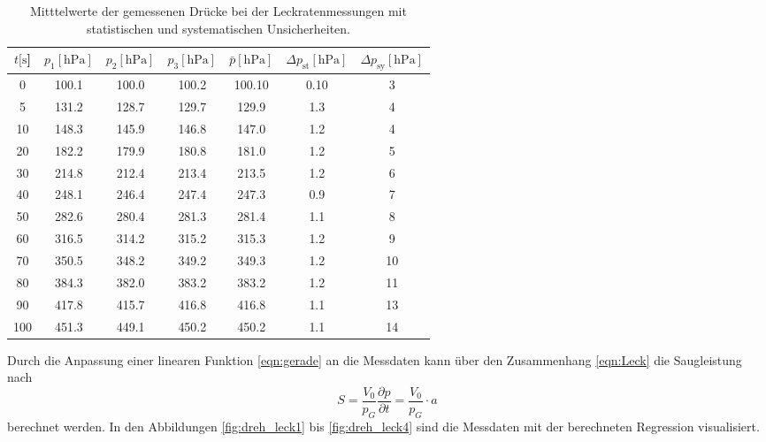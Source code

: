 %
\begin{table}[H]
  \centering
    \caption{Mitttelwerte der gemessenen Drücke bei der Leckratenmessungen mit statistischen und systematischen Unsicherheiten.}
    \label{tab:Dreh_Leck4}
    \begin{tabular}{
      S[table-format=3.0] 
      S[table-format=3.1] S[table-format=3.1] S[table-format=3.1]
      S[table-format=3.2] S[table-format=1.2] S[table-format=2.0]
      }
      \toprule
      {$t [\si{\second}$]} &
      {$p_1 [\si{\hecto\pascal}]$} & {$p_2 [\si{\hecto\pascal}]$} & {$p_3 [\si{\hecto\pascal}]$} &
      {$\bar{p} [\si{\hecto\pascal}]$} & {$\Delta p_\text{st} [\si{\hecto\pascal}]$} & {$\Delta p_\text{sy} [\si{\hecto\pascal}]$}\\
         & 100.1 & 100.0 & 100.2 & 100.10 & 0.10 & 3\\
      5   & 131.2 & 128.7 & 129.7 & 129.9  & 1.3 & 4 \\
      10  & 148.3 & 145.9 & 146.8 & 147.0  & 1.2 & 4 \\
      20  & 182.2 & 179.9 & 180.8 & 181.0  & 1.2 & 5 \\
      30  & 214.8 & 212.4 & 213.4 & 213.5  & 1.2 & 6 \\
      40  & 248.1 & 246.4 & 247.4 & 247.3  & 0.9 & 7 \\
      50  & 282.6 & 280.4 & 281.3 & 281.4  & 1.1 & 8 \\
      60  & 316.5 & 314.2 & 315.2 & 315.3  & 1.2 & 9 \\
      70  & 350.5 & 348.2 & 349.2 & 349.3  & 1.2 & 10\\
      80  & 384.3 & 382.0 & 383.2 & 383.2  & 1.2 & 11\\
      90  & 417.8 & 415.7 & 416.8 & 416.8  & 1.1 & 13\\
      100 & 451.3 & 449.1 & 450.2 & 450.2  & 1.1 & 14\\
      \bottomrule
    \end{tabular}
\end{table}
\noindent
Durch die Anpassung einer linearen Funktion \ref{eqn:gerade} an die Messdaten kann über den 
Zusammenhang \ref{eqn:Leck} die Saugleistung nach
\begin{equation}
  S=\frac{V_0}{p_G}\frac{\partial p}{\partial t}=\frac{V_0}{p_G}\cdot a
  \label{eqn:Leck2}
\end{equation} 
berechnet werden.
In den Abbildungen \ref{fig:dreh_leck1} bis \ref{fig:dreh_leck4} sind die Messdaten mit der 
berechneten Regression visualisiert.
